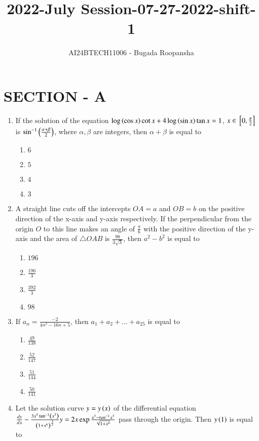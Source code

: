 \documentclass[journal,12pt,twocolumn]{IEEEtran}
\theoremstyle{remark}
\begin{document}

\vspace{3cm}
\title{2022-July Session-07-27-2022-shift-1}
\author{AI24BTECH11006 - Bugada Roopansha}
\maketitle
\section{SECTION - A}
\begin{enumerate}[start=16]
\item If the solution of the equation $\log\left(\cos{x}\right)\cot{x} + 4\log\left(\sin{x}\right)\tan{x} = 1$, $x \in {}\left[0, \frac{\pi}{2}\right]$ is $\sin^{-1}\left(\frac{\alpha + \beta}{2}\right)$, where $\alpha, \beta$ are integers, then $\alpha + \beta$ is equal to 
    \begin{enumerate}
    \item $6$
        \item $5$
        \item $4$
        \item $3$
    \end{enumerate}
\item A straight line cuts off the intercepts $OA = a$ and $OB = b$ on the positive direction of the x-axis and y-axis respectively. If the perpendicular from the origin $O$ to this line makes an angle of $\frac{\pi}{6}$ with the positive direction of the y-axis and the area of $\triangle OAB$ is $\frac{98}{3\sqrt{3}}$, then $a^2 - b^2$ is equal to 
    \begin{enumerate}
        \item $196$
        \item $\frac{196}{3}$
        \item $\frac{392}{3}$
        \item $98$
    \end{enumerate}
\item If $a_n=\frac{-2}{4n^2 - 16n + 5}$, then $a_1 + a_2 + \dots + a_{25}$ is equal to 
    \begin{enumerate}
        \item $\frac{49}{138}$
        \item $\frac{52}{147}$
        \item $\frac{51}{144}$
        \item $\frac{50}{141}$
    \end{enumerate}
\item Let the solution curve $y = y\left(x\right)$ of the differential equation $\frac{dy}{dx} - \frac{3 x^5 \tan^{-1}\left(x^3\right)}{\left(1+x^6\right)^\frac{3}{2}}y=2x\exp{\frac{x^3-tan^{-1} x^3}{\sqrt{1+x^6}}}$ pass through the origin. Then  $y\left(1\right)$ is equal to 

\end{enumerate}
\end{document}
